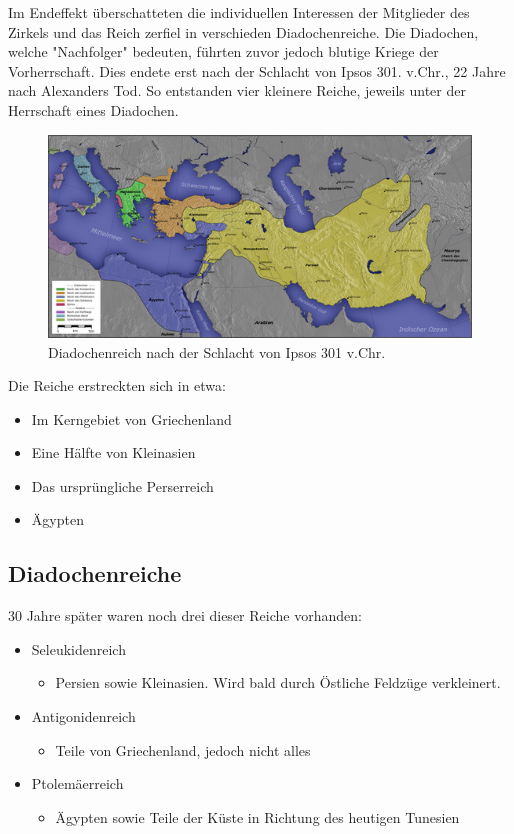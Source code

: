 \documentclass{article}
\begin{document}
	Im Endeffekt überschatteten die individuellen Interessen der Mitglieder des Zirkels und das Reich zerfiel in verschieden Diadochenreiche. Die Diadochen, welche "Nachfolger" bedeuten, führten zuvor jedoch blutige Kriege der Vorherrschaft. Dies endete erst nach der Schlacht von Ipsos 301. v.Chr., 22 Jahre nach Alexanders Tod. So entstanden vier kleinere Reiche, jeweils unter der Herrschaft eines Diadochen. 
	\begin{figure}[H]
	\includegraphics{Diadochen.jpeg}
	\caption{Diadochenreich nach der Schlacht von Ipsos 301 v.Chr.}
	\end{figure}
	\vspace{1cm}
	Die Reiche erstreckten sich in etwa:
	\begin{itemize}
		\item{Im Kerngebiet von Griechenland}
		\item{Eine Hälfte von Kleinasien}
		\item{Das ursprüngliche Perserreich}
		\item{Ägypten}
	\end{itemize}
	\subsection{Diadochenreiche}
	30 Jahre später waren noch drei dieser Reiche vorhanden:
	\begin{itemize}
		\item{Seleukidenreich}
		\begin{itemize}
			\item{Persien sowie Kleinasien. Wird bald durch Östliche Feldzüge verkleinert.}
		\end{itemize}
		\item{Antigonidenreich}
		\begin{itemize}
			\item{Teile von Griechenland, jedoch nicht alles}
		\end{itemize}
		\item{Ptolemäerreich}
		\begin{itemize}
			\item{Ägypten sowie Teile der Küste in Richtung des heutigen Tunesien}
		\end{itemize}
	\end{itemize}
\end{document}
